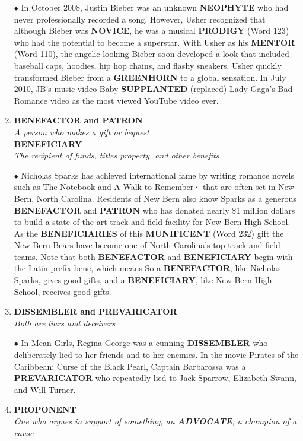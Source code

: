 \documentclass{book}
\begin{document}
\begin{enumerate}
$ \bullet $ In October 2008, Justin Bieber was an unknown
\textbf{NEOPHYTE} who had never professionally recorded a
song. However, Usher recognized that although
Bieber was \textbf{NOVICE}, he was a musical \textbf{PRODIGY}
(Word 123) who had the potential to become a
superstar. With Usher as his \textbf{MENTOR} (Word 110),
the angelic-looking Bieber soon developed a  look that included baseball caps, hoodies, hip
hop chains, and flashy sneakers. Usher quickly
transformed Bieber from a \textbf{GREENHORN} to a global
sensation. In July 2010, JB's music video Baby
\textbf{SUPPLANTED} (replaced) Lady Gaga's Bad Romance
video as the most viewed YouTube video ever.

 \item \textbf{BENEFACTOR and PATRON}\\
\textit{A person who makes a gift or bequest}\\
\textbf{BENEFICIARY}\\
\textit{The recipient of funds, titles property, and
other benefits}

$ \bullet $ Nicholas Sparks has achieved international fame by
writing romance novels such as The Notebook and A
Walk to Remember· that are often set in New Bern,
North Carolina. Residents of New Bern also know
Sparks as a generous \textbf{BENEFACTOR} and \textbf{PATRON}
who has donated nearly \$1 million dollars to build a
state-of-the-art track and field facility for New Bern
High School. As the \textbf{BENEFICIARIES} of this \textbf{MUNIFICENT} (Word 232) gift the New Bern Bears have
become one of North Carolina's top track and field
teams. Note that both \textbf{BENEFACTOR} and \textbf{BENEFICIARY} begin with the Latin prefix bene, which means  So a \textbf{BENEFACTOR}, like Nicholas Sparks,
gives good gifts, and a \textbf{BENEFICIARY}, like New Bern
High School, receives good gifts.

 \item \textbf{DISSEMBLER and PREVARICATOR}\\
\textit{Both are liars and deceivers}

$ \bullet $ In Mean Girls, Regina George was a cunning \textbf{DISSEMBLER} who deliberately lied to her friends and to
her enemies. In the movie Pirates of the Caribbean:
Curse of the Black Pearl, Captain Barbarossa was a
\textbf{PREVARICATOR} who repeatedly lied to Jack Sparrow,
Elizabeth Swann, and Will Turner.


 \item\textbf{PROPONENT}\\
\textit{One who argues in support of something; an
\textbf{ADVOCATE}; a champion of a cause}


\end{enumerate}
\end{document}
